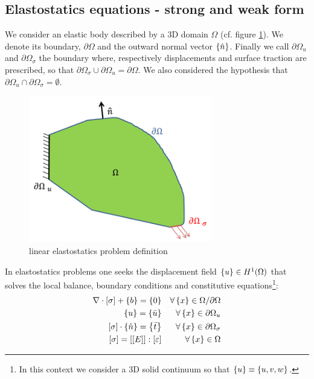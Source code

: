 \subsection{Elastostatics equations - strong and weak form}\label{subsec:1.1.1}
We consider an elastic body described by a 3D domain $\Omega$ (cf. figure \ref{fig.1}). We denote its boundary, $\partial \Omega$ and the outward normal vector $\left\lbrace{\hat{n}}\right \rbrace$.
Finally we call $\partial \Omega_{u}$ and $\partial \Omega_{\sigma}$ the boundary where, respectively displacements and surface traction are prescribed, so that $\partial \Omega_{\sigma} \cup \partial \Omega_{u} =\partial \Omega $. We also considered the hypothesis that $\partial \Omega_{u} \cap\partial \Omega_{\sigma}=\emptyset$.\\
\begin{figure}[ht]
\centering
\includegraphics[width=8cm]{images/Ch1/solid}
\caption{linear elastostatics problem definition}
\label{fig.1}
\end{figure}
In elastostatics problems one seeks the displacement field $\left\lbrace{u}\right \rbrace \in H^1(\Omega)$ that solves the local balance, boundary conditions and constitutive equations\footnote{In this context we consider a 3D solid continuum so that $\left\lbrace{u}\right \rbrace\equiv \left\lbrace{u,v,w}\right \rbrace$.}:
\begin{eqnarray}
\label{eq.1.1}
\nabla \cdot \left[{\sigma}\right] + \left\lbrace{b}\right \rbrace=\left\lbrace{0}\right \rbrace  & & \forall \left\lbrace{x}\right \rbrace \in \Omega/\partial \Omega \\
\label{eq.1.2}
\left\lbrace{u}\right \rbrace=\left\lbrace{\bar{u}}\right \rbrace & & \forall \left\lbrace{x}\right \rbrace \in \partial \Omega_{u}  \\
\label{eq.1.3}
\left[{\sigma}\right]\cdot\left\lbrace{\hat{n}}\right \rbrace=\left\lbrace{\bar{t}}\right \rbrace & & \forall \left\lbrace{x}\right \rbrace \in \partial \Omega_{\sigma}
\\
\label{eq.1.4}
\left[{\sigma}\right]=\left[{\left[{E}\right]}\right]:\left[{ 	\varepsilon}\right] & & \forall \left\lbrace{x}\right \rbrace \in \Omega
\end{eqnarray}
